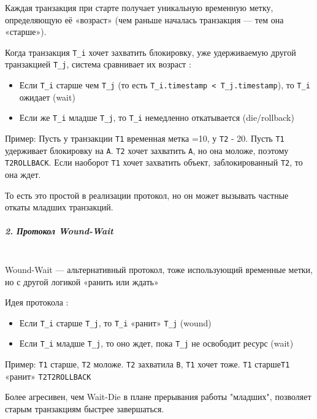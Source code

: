  Каждая транзакция при старте получает уникальную временную метку, определяющую её «возраст» (чем раньше началась транзакция — тем она «старше»).
 
 Когда транзакция \texttt{T\_i} хочет захватить блокировку, уже удерживаемую другой транзакцией \texttt{T\_j}, система сравнивает их возраст \autocite{Silberschatz, ElmasriNavathe}:
 \begin{itemize}
     \item Если \texttt{T\_i} старше чем \texttt{T\_j} (то есть \texttt{T\_i.timestamp < T\_j.timestamp}), то \texttt{T\_i} ожидает (wait)
     \item Если же \texttt{T\_i} младше \texttt{T\_j}, то \texttt{T\_i} немедленно откатывается (die/rollback)
 \end{itemize}
 
 Пример:
 Пусть у транзакции \texttt{T1} временная метка =10, у \texttt{T2} - 20. Пусть \texttt{T1} удерживает блокировку на \texttt{A}. \texttt{T2} хочет захватить \texttt{A}, но она моложе, поэтому \texttt{T2\textrightarrow ROLLBACK}. Если наоборот \texttt{T1} хочет захватить объект, заблокированный \texttt{T2}, то она ждет.
 
 То есть это простой в реализации протокол, но он может вызывать частные откаты младших транзакций.
 
 \subparagraph{2. Протокол Wound-Wait} ~\\
 
 Wound-Wait — альтернативный протокол, тоже использующий временные метки, но с другой логикой «ранить или ждать»
 
 Идея протокола \autocite{Silberschatz, ElmasriNavathe}:
 \begin{itemize}
     \item Если \texttt{T\_i} старше \texttt{T\_j}, то \texttt{T\_i} «ранит» \texttt{T\_j} (wound)
     \item Если \texttt{T\_i} младше \texttt{T\_j}, то оно ждет, пока \texttt{T\_j} не освободит ресурс (wait)
 \end{itemize}
 
 Пример:
 \texttt{T1} старше, \texttt{T2} моложе. \texttt{T2} захватила \texttt{B}, \texttt{T1} хочет тоже. \texttt{T1} старше\textrightarrow \texttt{T1} «ранит» \texttt{T2}\textrightarrow \texttt{T2\textrightarrow ROLLBACK} 
 
 Более агресивен, чем Wait-Die в плане прерывания работы "младших", позволяет старым транзакциям быстрее завершаться.
 
